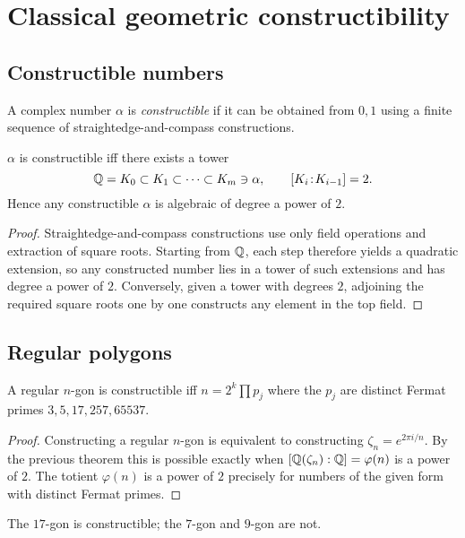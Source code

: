 \section{Classical geometric constructibility}\label{sec:constructibility}

\subsection{Constructible numbers}
\begin{definition}
A complex number $\alpha$ is \emph{constructible} if it can be obtained from $0,1$ using a finite sequence of straightedge-and-compass constructions.
\end{definition}
\begin{theorem}
$\alpha$ is constructible iff there exists a tower
\[
\mathbb{Q}=K_0\subset K_1\subset\cdots\subset K_m\ni \alpha,\qquad [K_i\!:\!K_{i-1}]=2.
\]
Hence any constructible $\alpha$ is algebraic of degree a power of $2$.
\end{theorem}
\begin{proof}
Straightedge-and-compass constructions use only field operations and extraction of square roots. Starting from $\mathbb{Q}$, each step therefore yields a quadratic extension, so any constructed number lies in a tower of such extensions and has degree a power of $2$. Conversely, given a tower with degrees $2$, adjoining the required square roots one by one constructs any element in the top field.
\end{proof}

\subsection{Regular polygons}
\begin{theorem}
A regular $n$-gon is constructible iff $n=2^k \prod p_j$ where the $p_j$ are distinct Fermat primes $3,5,17,257,65537$.
\end{theorem}
\begin{proof}
Constructing a regular $n$-gon is equivalent to constructing $\zeta_n=e^{2\pi i/n}$. By the previous theorem this is possible exactly when $[\mathbb{Q}(\zeta_n):\mathbb{Q}]=\varphi(n)$ is a power of $2$. The totient $\varphi(n)$ is a power of $2$ precisely for numbers of the given form with distinct Fermat primes.
\end{proof}
\begin{example}
The $17$-gon is constructible; the $7$-gon and $9$-gon are not.
\end{example}

